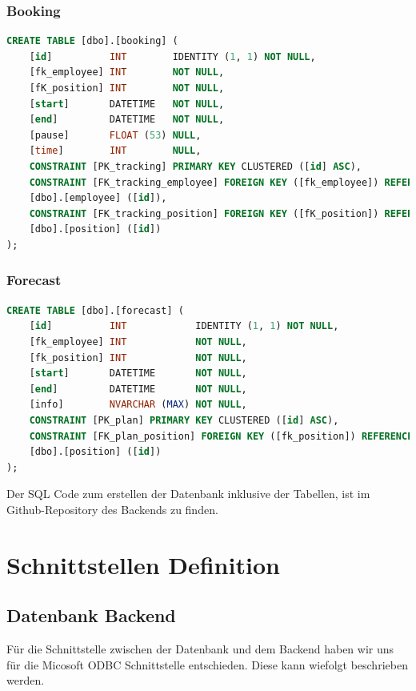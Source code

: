 \documentclass{article}
\begin{document}
\subsubsection{Booking}
\begin{lstlisting}[language=Sql, caption= Create Table Statement für Booking Table]
    CREATE TABLE [dbo].[booking] (
    [id]          INT        IDENTITY (1, 1) NOT NULL,
    [fk_employee] INT        NOT NULL,
    [fK_position] INT        NOT NULL,
    [start]       DATETIME   NOT NULL,
    [end]         DATETIME   NOT NULL,
    [pause]       FLOAT (53) NULL,
    [time]        INT        NULL,
    CONSTRAINT [PK_tracking] PRIMARY KEY CLUSTERED ([id] ASC),
    CONSTRAINT [FK_tracking_employee] FOREIGN KEY ([fk_employee]) REFERENCES
    [dbo].[employee] ([id]),
    CONSTRAINT [FK_tracking_position] FOREIGN KEY ([fK_position]) REFERENCES
    [dbo].[position] ([id])
);


         \end{lstlisting}
\subsubsection{Forecast}
\begin{lstlisting}[language=Sql, caption= Create Table Statement für Forecast Table]
    CREATE TABLE [dbo].[forecast] (
    [id]          INT            IDENTITY (1, 1) NOT NULL,
    [fk_employee] INT            NOT NULL,
    [fk_position] INT            NOT NULL,
    [start]       DATETIME       NOT NULL,
    [end]         DATETIME       NOT NULL,
    [info]        NVARCHAR (MAX) NOT NULL,
    CONSTRAINT [PK_plan] PRIMARY KEY CLUSTERED ([id] ASC),
    CONSTRAINT [FK_plan_position] FOREIGN KEY ([fk_position]) REFERENCES 
    [dbo].[position] ([id])
);


         \end{lstlisting}

Der SQL Code zum erstellen der Datenbank inklusive der Tabellen, ist im
Github-Repository des Backends zu finden.

\newpage

\section{Schnittstellen Definition}

\subsection{Datenbank Backend}
Für die Schnittstelle zwischen der Datenbank und dem Backend haben wir uns für
die Micosoft ODBC Schnittstelle entschieden. Diese kann wiefolgt beschrieben
werden.
\end{document}
